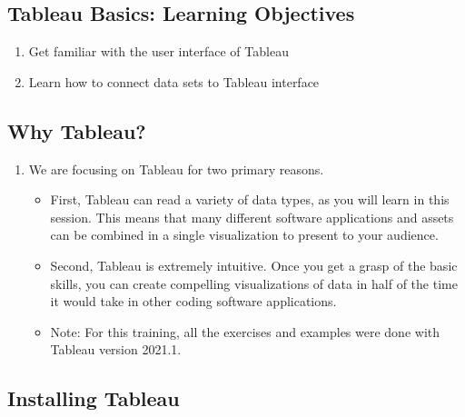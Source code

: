 \documentclass[
]{book}
\providecommand{\tightlist}{%
  \setlength{\itemsep}{0pt}\setlength{\parskip}{0pt}}
\begin{document}
\hypertarget{tableau-basics-learning-objectives}{%
\subsection{Tableau Basics: Learning Objectives}\label{tableau-basics-learning-objectives}}

\begin{enumerate}
\def\labelenumi{\arabic{enumi}.}
\item
  Get familiar with the user interface of Tableau
\item
  Learn how to connect data sets to Tableau interface
\end{enumerate}

\hypertarget{why-tableau}{%
\subsection{Why Tableau?}\label{why-tableau}}

\begin{enumerate}
\def\labelenumi{\arabic{enumi}.}
\tightlist
\item
  We are focusing on Tableau for two primary reasons.

  \begin{itemize}
  \tightlist
  \item
    First, Tableau can read a variety of data types, as you will learn in this session. This means that many different software applications and assets can be combined in a single visualization to present to your audience.
  \item
    Second, Tableau is extremely intuitive. Once you get a grasp of the basic skills, you can create compelling visualizations of data in half of the time it would take in other coding software applications.
  \item
    Note: For this training, all the exercises and examples were done with Tableau version 2021.1.
  \end{itemize}
\end{enumerate}

\hypertarget{installing-tableau}{%
\subsection{Installing Tableau}\label{installing-tableau}}
\end{document}
